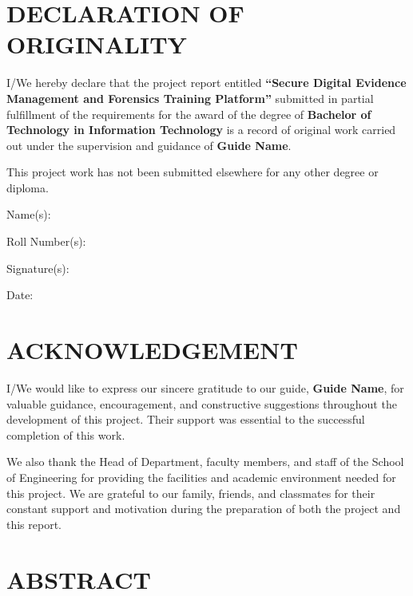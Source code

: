 \documentclass[12pt,a4paper]{report}
\begin{document}
\clearpage

\chapter*{DECLARATION OF ORIGINALITY}

I/We hereby declare that the project report entitled \textbf{``Secure Digital Evidence Management and Forensics Training Platform''} submitted in partial fulfillment of the requirements for the award of the degree of \textbf{Bachelor of Technology in Information Technology} is a record of original work carried out under the supervision and guidance of \textbf{Guide Name}.

This project work has not been submitted elsewhere for any other degree or diploma.

\vspace{1.5cm}

Name(s): \hrulefill

Roll Number(s): \hrulefill

Signature(s): \hrulefill

Date: \hrulefill

\clearpage

\chapter*{ACKNOWLEDGEMENT}

I/We would like to express our sincere gratitude to our guide, \textbf{Guide Name}, for valuable guidance, encouragement, and constructive suggestions throughout the development of this project. Their support was essential to the successful completion of this work.

We also thank the Head of Department, faculty members, and staff of the School of Engineering for providing the facilities and academic environment needed for this project. We are grateful to our family, friends, and classmates for their constant support and motivation during the preparation of both the project and this report.

\clearpage

\chapter*{ABSTRACT}
\end{document}
